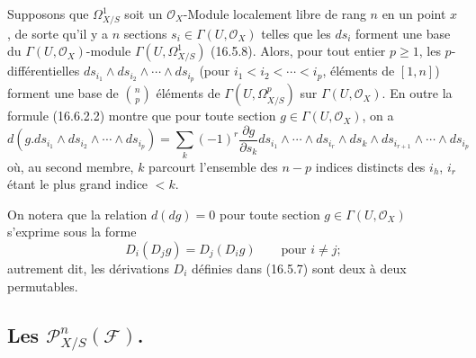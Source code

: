 \begin{env}[16.6.5]
\label{IV.16.6.5}
Supposons que $\Omega_{X/S}^1$ soit un $\mathcal{O}_X$-Module localement libre
de rang $n$ en un point $x$, de sorte qu'il y a $n$ sections
$s_i\in\Gamma(U,\mathcal{O}_X)$ telles que les $ds_i$ forment une base du
$\Gamma(U,\mathcal{O}_X)$-module $\Gamma(U,\Omega_{X/S}^1)$ (16.5.8).
Alors, pour tout entier $p\geq1$, les $p$-différentielles
$ds_{i_1}\wedge ds_{i_2}\wedge\cdots\wedge ds_{i_p}$ (pour
$i_1<i_2<\cdots<i_p$, éléments de $[1,n]$) forment une base de
$\binom{n}{p}$ éléments de $\Gamma(U,\Omega_{X/S}^p)$ sur
$\Gamma(U,\mathcal{O}_X)$. En outre la formule (16.6.2.2) montre que pour
toute section $g\in\Gamma(U,\mathcal{O}_X)$, on a
\[
  d(g.ds_{i_1}\wedge ds_{i_2}\wedge\cdots\wedge ds_{i_p})
  =\sum_k(-1)^r\frac{\partial g}{\partial s_k}
  ds_{i_1}\wedge\cdots\wedge ds_{i_r}\wedge ds_k\wedge
  ds_{i_{r+1}}\wedge\cdots\wedge ds_{i_p}
  \tag{16.6.5.1}
  \label{IV.16.6.5.1}
\]
où, au second membre, $k$ parcourt l'ensemble des $n-p$ indices distincts des
$i_h$, $i_r$ étant le plus grand indice $<k$.

On notera que la relation $d(dg)=0$ pour toute section
$g\in\Gamma(U,\mathcal{O}_X)$ s'exprime sous la forme
\[
  D_i(D_jg)=D_j(D_ig)\qquad\text{pour $i\neq j$};
\]
autrement dit, les dérivations $D_i$ définies dans (16.5.7) sont deux à deux
permutables.
\end{env}

\subsection{\texorpdfstring{Les $\mathscr{P}_{X/S}^n(\mathscr{F})$.}{Les P\string_\string^n(F).}}

